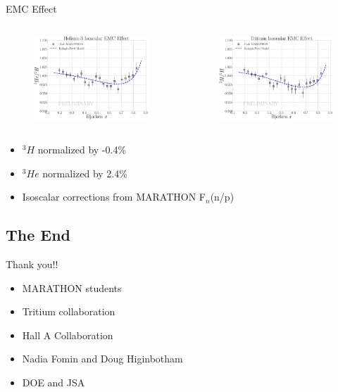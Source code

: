 \documentclass{beamer}
\begin{document}
\begin{frame}{EMC Effect}
\vspace*{-20pt}
\begin{columns}
	\hspace*{-30pt}
	\begin{figure}
		\includegraphics[width=6.35cm]{../images/He3_EMC_MARA.pdf}
	\end{figure}
	\begin{figure}
		\includegraphics[width=6.35cm]{../images/H3_EMC_MARA.pdf}
	\end{figure}
\end{columns}
\begin{itemize}
	\item $^3H$ normalized by -0.4\%
	\item $^3He$ normalized by 2.4\%
	\item Isoscalar corrections from MARATHON F$_n$(n/p)
\end{itemize}

\end{frame}

\subsection[The End]{The End}
\begin{frame}
\begin{block}{Thank you!!}
	\begin{itemize}
		\item MARATHON students
		\item Tritium collaboration
		\item Hall A Collaboration
		\item Nadia Fomin and Doug Higinbotham
		\item DOE and JSA
	\end{itemize}
\end{block}
\end{frame}
\end{document}
